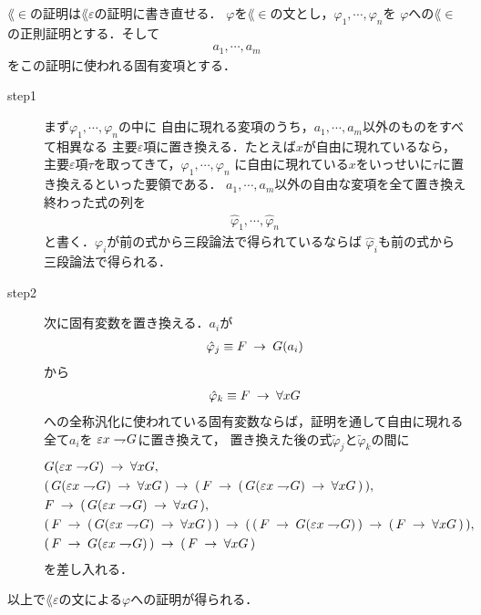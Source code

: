 	$\lang{\in}$の証明は$\lang{\varepsilon}$の証明に書き直せる．
	$\varphi$を$\lang{\in}$の文とし，$\varphi_{1},\cdots,\varphi_{n}$を
	$\varphi$への$\lang{\in}$の正則証明とする．そして
	\begin{align}
		a_{1},\cdots,a_{m}
	\end{align}
	をこの証明に使われる固有変項とする．
	\begin{description}
		\item[step1]
			まず$\varphi_{1},\cdots,\varphi_{n}$の中に
			自由に現れる変項のうち，$a_{1},\cdots,a_{m}$以外のものをすべて相異なる
			主要$\varepsilon$項に置き換える．たとえば$x$が自由に現れているなら，
			主要$\varepsilon$項$\tau$を取ってきて，$\varphi_{1},\cdots,\varphi_{n}$
			に自由に現れている$x$をいっせいに$\tau$に置き換えるといった要領である．
			$a_{1},\cdots,a_{m}$以外の自由な変項を全て置き換え終わった式の列を
			\begin{align}
				\hat{\varphi}_{1}, \cdots, \hat{\varphi}_{n}
			\end{align}
			と書く．$\varphi_{i}$が前の式から三段論法で得られているならば
			$\hat{\varphi}_{i}$も前の式から三段論法で得られる．
			
		\item[step2]
			次に固有変数を置き換える．$a_{i}$が
			\begin{align}
				\hat{\varphi}_{j} \equiv F \hspace{0.25em}\rightarrow\hspace{0.25em} G(a_{i})
			\end{align}
			から
			\begin{align}
				\hat{\varphi}_{k} \equiv F \hspace{0.25em}\rightarrow\hspace{0.25em} \forall x G
			\end{align}
			への全称汎化に使われている固有変数ならば，証明を通して自由に現れる全て$a_{i}$を
			$\varepsilon x \rightharpoondown\hspace{-0.25em} G$に置き換えて，
			置き換えた後の式$\tilde{\varphi}_{j}$と$\tilde{\varphi}_{k}$の間に
			\begin{align}
				&G(\varepsilon x \rightharpoondown\hspace{-0.25em} G) \hspace{0.25em}\rightarrow\hspace{0.25em} \forall x G, \\
				&(\, G(\varepsilon x \rightharpoondown\hspace{-0.25em} G) \hspace{0.25em}\rightarrow\hspace{0.25em} \forall x G\, )
				\hspace{0.25em}\rightarrow\hspace{0.25em} (\, F \hspace{0.25em}\rightarrow\hspace{0.25em} (\, G(\varepsilon x \rightharpoondown\hspace{-0.25em} G) \hspace{0.25em}\rightarrow\hspace{0.25em} \forall x G\, )\, ), \\
				&F \hspace{0.25em}\rightarrow\hspace{0.25em} (\, G(\varepsilon x \rightharpoondown\hspace{-0.25em} G) \hspace{0.25em}\rightarrow\hspace{0.25em} \forall x G\, ), \\
				&(\, F \hspace{0.25em}\rightarrow\hspace{0.25em} (\, G(\varepsilon x \rightharpoondown\hspace{-0.25em} G) \hspace{0.25em}\rightarrow\hspace{0.25em} \forall x G\, )\, ) \hspace{0.25em}\rightarrow\hspace{0.25em}
				(\, (\, F \hspace{0.25em}\rightarrow\hspace{0.25em} G(\varepsilon x \rightharpoondown\hspace{-0.25em} G)\, ) \hspace{0.25em}\rightarrow\hspace{0.25em}
				(\, F \hspace{0.25em}\rightarrow\hspace{0.25em} \forall x G\, )\, ), \\
				&(\, F \hspace{0.25em}\rightarrow\hspace{0.25em} G(\varepsilon x \rightharpoondown\hspace{-0.25em} G)\, ) \hspace{0.25em}\rightarrow\hspace{0.25em}
				(\, F \hspace{0.25em}\rightarrow\hspace{0.25em} \forall x G\, )
			\end{align}
			を差し入れる．
	\end{description}
	以上で$\lang{\varepsilon}$の文による$\varphi$への証明が得られる．
	
